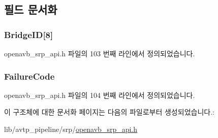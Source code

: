 \subsection{필드 문서화}
\subsubsection[{\texorpdfstring{Bridge\+ID}{BridgeID}}]{ Bridge\+ID\mbox{[}8\mbox{]}}\hypertarget{structopenavb_srp_fail_info_ac43b1d8c22addf9053c0dc573188dd81}{}\label{structopenavb_srp_fail_info_ac43b1d8c22addf9053c0dc573188dd81}


openavb\+\_\+srp\+\_\+api.\+h 파일의 103 번째 라인에서 정의되었습니다.

\subsubsection[{\texorpdfstring{Failure\+Code}{FailureCode}}]{ Failure\+Code}\hypertarget{structopenavb_srp_fail_info_a2a87e0fc692a78fcca21d2e9295f7b5c}{}\label{structopenavb_srp_fail_info_a2a87e0fc692a78fcca21d2e9295f7b5c}


openavb\+\_\+srp\+\_\+api.\+h 파일의 104 번째 라인에서 정의되었습니다.



이 구조체에 대한 문서화 페이지는 다음의 파일로부터 생성되었습니다.\+:\begin{DoxyCompactItemize}
\item 
lib/avtp\+\_\+pipeline/srp/\hyperlink{openavb__srp__api_8h}{openavb\+\_\+srp\+\_\+api.\+h}\end{DoxyCompactItemize}
